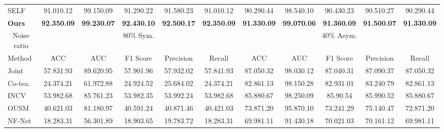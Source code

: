 \begin{table*}[]
\begin{tabular}{@{}lcccccccccc@{}}
SELF                            & 91.010.12          & 99.150.09          & 91.290.22          & 91.580.23          & 91.010.12          & 90.290.44          & 98.540.10          & 90.430.23          & 90.510.27          & 90.290.44          \\
\textbf{Ours}                   & \textbf{92.350.09} & \textbf{99.230.07} & \textbf{92.430.10} & \textbf{92.500.17} & \textbf{92.350.09} & \textbf{91.330.09} & \textbf{99.070.06} & \textbf{91.360.09} & \textbf{91.500.07} & \textbf{91.330.09} \\ \midrule
\multicolumn{1}{c}{Noise ratio} & \multicolumn{5}{c}{80\% Sym.}                                                                                    & \multicolumn{5}{c}{40\% Asym.}                                                                                   \\ \midrule
Method                & ACC                  & AUC                  & F1 Score             & {Precision}                  & Recall               & ACC                  & AUC                  & F1 Score             & {Precision}                  & Recall               \\ \midrule
Joint                     & 57.831.93          & 89.620.95          & 57.901.96          & 57.932.02          & 57.841.93          & 87.050.32          & 98.030.12          & 87.040.31          & 87.090.37          & 87.050.32          \\
Co-tea.                     & 24.374.21          & 61.972.88          & 24.924.52          & 25.684.02          & 24.374.21          & 82.861.13          & 98.150.28          & 82.931.01          & 83.240.79          & 82.861.13          \\
INCV                            & 53.982.68          & 85.761.23          & 53.982.35          & 53.992.24          & 53.982.68          & 85.880.67          & 98.250.09          & 85.90.54           & 85.990.52          & 85.880.67          \\
OUSM                       & 40.621.03          & 81.180.97          & 40.591.24          & 40.871.46          & 40.421.03          & 73.871.20          & 95.870.10          & 73.241.29          & 75.140.47          & 72.871.20          \\
NF-Net                          & 18.283.31          & 56.301.89          & 18.903.65          & 19.783.72          & 18.283.31          & 69.981.11          & 91.430.18          & 70.021.03          & 70.161.12          & 69.981.11          \\

\end{tabular}
\end{table*}
